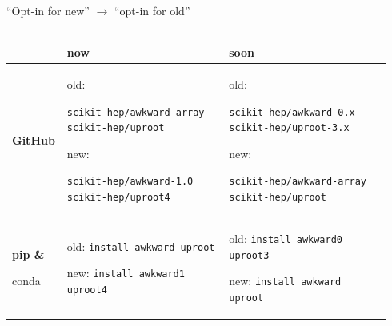 \documentclass[aspectratio=169]{beamer}
\begin{document}
\begin{frame}{``Opt-in for new'' $\longrightarrow$ ``opt-in for old''}
\large
\vspace{0.5 cm}
\begin{columns}
\begin{tabular}{p{0.1\linewidth} | p{0.42\linewidth} | p{0.42\linewidth}}
& {\bf now} & {\bf soon} \\\hline

{\bf GitHub} & \begin{minipage}{\linewidth}
\vspace{0.15 cm}
old:

{\small\tt scikit-hep/awkward-array} {\small\tt scikit-hep/uproot}

new:

{\small\tt scikit-hep/awkward-1.0} {\small\tt scikit-hep/uproot4}
\vspace{0.15 cm}
\end{minipage} & \begin{minipage}{\linewidth}
\vspace{0.15 cm}
old:

{\small\tt scikit-hep/awkward-0.x} {\small\tt scikit-hep/uproot-3.x}

new:

{\small\tt scikit-hep/awkward-array} {\small\tt scikit-hep/uproot}
\vspace{0.15 cm}
\end{minipage} \\\hline

\begin{minipage}{\linewidth}\bf pip \&

conda\end{minipage} & \begin{minipage}{\linewidth}
\vspace{0.15 cm}
old: {\small \texttt{install awkward uproot}}

new: {\small \texttt{install awkward1 uproot4}}
\vspace{0.15 cm}
\end{minipage} & \begin{minipage}{\linewidth}
\vspace{0.15 cm}
old: {\small \texttt{install awkward0 uproot3}}

new: {\small \texttt{install awkward uproot}}
\vspace{0.15 cm}
\end{minipage} \\\hline


\end{tabular}
\end{columns}
\end{frame}
\end{document}
